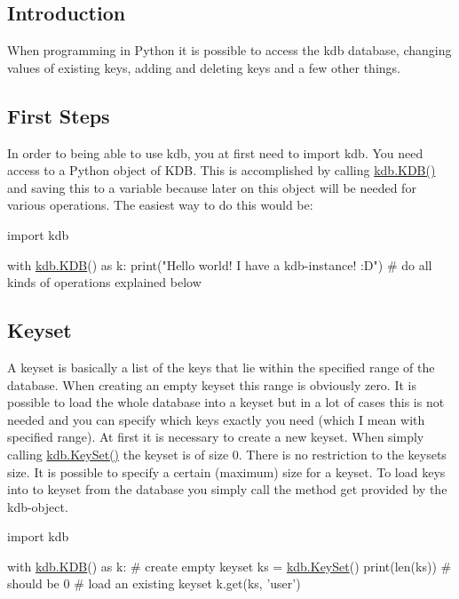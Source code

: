 \subsection*{Introduction}

When programming in Python it is possible to access the kdb database, changing values of existing keys, adding and deleting keys and a few other things.

\subsection*{First Steps}

In order to being able to use {\ttfamily kdb}, you at first need to {\ttfamily import kdb}. You need access to a Python object of {\ttfamily K\+DB}. This is accomplished by calling {\ttfamily \hyperlink{classkdb_1_1KDB}{kdb.\+K\+D\+B()}} and saving this to a variable because later on this object will be needed for various operations. The easiest way to do this would be\+:


\begin{DoxyCode}
\textcolor{keyword}{import} kdb

with \hyperlink{classkdb_1_1KDB}{kdb.KDB}() \textcolor{keyword}{as} k:
    print(\textcolor{stringliteral}{"Hello world! I have a kdb-instance! :D"})
    \textcolor{comment}{# do all kinds of operations explained below}
\end{DoxyCode}


\subsection*{Keyset}

A keyset is basically a list of the keys that lie within the specified range of the database. When creating an empty keyset this range is obviously zero. It is possible to load the whole database into a keyset but in a lot of cases this is not needed and you can specify which keys exactly you need (which I mean with specified range). At first it is necessary to create a new keyset. When simply calling {\ttfamily \hyperlink{classkdb_1_1KeySet}{kdb.\+Key\+Set()}} the keyset is of size 0. There is no restriction to the keyset\textquotesingle{}s size. It is possible to specify a certain (maximum) size for a keyset. To load keys into to keyset from the database you simply call the method {\ttfamily get} provided by the kdb-\/object.


\begin{DoxyCode}
\textcolor{keyword}{import} kdb

with \hyperlink{classkdb_1_1KDB}{kdb.KDB}() \textcolor{keyword}{as} k:
    \textcolor{comment}{# create empty keyset}
    ks = \hyperlink{classkdb_1_1KeySet}{kdb.KeySet}()
    print(len(ks))  \textcolor{comment}{# should be 0}
    \textcolor{comment}{# load an existing keyset}
    k.get(ks, \textcolor{stringliteral}{'user'})
\end{DoxyCode}


